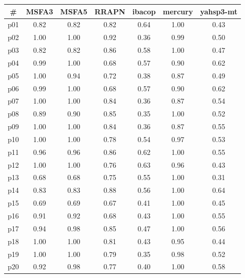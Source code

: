 \begin{tabular}{c||c|c|c|c|c|c}
\textbf{\#} & \textbf{MSFA3} & \textbf{MSFA5} & \textbf{RRAPN} & \textbf{ibacop} & \textbf{mercury} & \textbf{yahsp3-mt}\\
\hline
\hline
p01 & 0.82 & 0.82 & 0.82 & 0.64 & 1.00 & 0.43\\
p02 & 1.00 & 1.00 & 0.92 & 0.36 & 0.99 & 0.50\\
p03 & 0.82 & 0.82 & 0.86 & 0.58 & 1.00 & 0.47\\
p04 & 0.99 & 1.00 & 0.68 & 0.57 & 0.90 & 0.62\\
p05 & 1.00 & 0.94 & 0.72 & 0.38 & 0.87 & 0.49\\
p06 & 0.99 & 1.00 & 0.68 & 0.57 & 0.90 & 0.62\\
p07 & 1.00 & 1.00 & 0.84 & 0.36 & 0.87 & 0.54\\
p08 & 0.89 & 0.90 & 0.85 & 0.35 & 1.00 & 0.52\\
p09 & 1.00 & 1.00 & 0.84 & 0.36 & 0.87 & 0.55\\
p10 & 1.00 & 1.00 & 0.78 & 0.54 & 0.97 & 0.53\\
p11 & 0.96 & 0.96 & 0.86 & 0.62 & 1.00 & 0.55\\
p12 & 1.00 & 1.00 & 0.76 & 0.63 & 0.96 & 0.43\\
p13 & 0.68 & 0.68 & 0.75 & 0.55 & 1.00 & 0.31\\
p14 & 0.83 & 0.83 & 0.88 & 0.56 & 1.00 & 0.64\\
p15 & 0.69 & 0.69 & 0.67 & 0.41 & 1.00 & 0.45\\
p16 & 0.91 & 0.92 & 0.68 & 0.43 & 1.00 & 0.55\\
p17 & 0.94 & 0.98 & 0.85 & 0.47 & 1.00 & 0.56\\
p18 & 1.00 & 1.00 & 0.81 & 0.43 & 0.95 & 0.44\\
p19 & 1.00 & 1.00 & 0.79 & 0.35 & 0.98 & 0.52\\
p20 & 0.92 & 0.98 & 0.77 & 0.40 & 1.00 & 0.58\\
\end{tabular}

